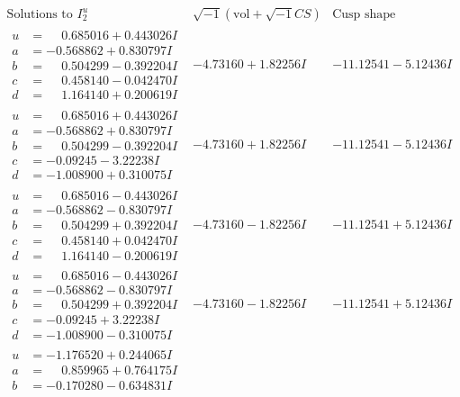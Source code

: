 \documentclass[1p]{elsarticle_modified}
\theoremstyle{definition}
\newcommand{\I}{\sqrt{-1}}
\begin{document}
$$\begin{array}{c|c|c}  
\text{Solutions to }I^u_{2}& \I (\text{vol} + \sqrt{-1}CS) & \text{Cusp shape}\\
 \hline 
\begin{aligned}
u &= \phantom{-}0.685016 + 0.443026 I \\
a &= -0.568862 + 0.830797 I \\
b &= \phantom{-}0.504299 - 0.392204 I \\
c &= \phantom{-}0.458140 - 0.042470 I \\
d &= \phantom{-}1.164140 + 0.200619 I\end{aligned}
 & -4.73160 + 1.82256 I & -11.12541 - 5.12436 I \\ \hline\begin{aligned}
u &= \phantom{-}0.685016 + 0.443026 I \\
a &= -0.568862 + 0.830797 I \\
b &= \phantom{-}0.504299 - 0.392204 I \\
c &= -0.09245 - 3.22238 I \\
d &= -1.008900 + 0.310075 I\end{aligned}
 & -4.73160 + 1.82256 I & -11.12541 - 5.12436 I \\ \hline\begin{aligned}
u &= \phantom{-}0.685016 - 0.443026 I \\
a &= -0.568862 - 0.830797 I \\
b &= \phantom{-}0.504299 + 0.392204 I \\
c &= \phantom{-}0.458140 + 0.042470 I \\
d &= \phantom{-}1.164140 - 0.200619 I\end{aligned}
 & -4.73160 - 1.82256 I & -11.12541 + 5.12436 I \\ \hline\begin{aligned}
u &= \phantom{-}0.685016 - 0.443026 I \\
a &= -0.568862 - 0.830797 I \\
b &= \phantom{-}0.504299 + 0.392204 I \\
c &= -0.09245 + 3.22238 I \\
d &= -1.008900 - 0.310075 I\end{aligned}
 & -4.73160 - 1.82256 I & -11.12541 + 5.12436 I \\ \hline\begin{aligned}
u &= -1.176520 + 0.244065 I \\
a &= \phantom{-}0.859965 + 0.764175 I \\
b &= -0.170280 - 0.634831 I \\

\end{aligned}
\end{array}$$
\end{document}
